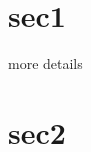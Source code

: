 \documentclass{beamer}
\begin{document}
    \section{sec1}

    \begin{frame}[label=moredetails]
        more details
    \end{frame}

    \section{sec2}
\end{document}
